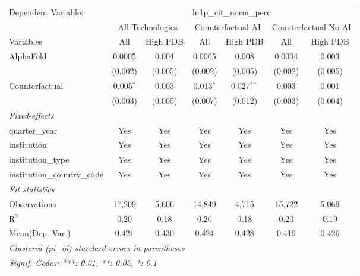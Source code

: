 \begingroup
\centering
\begin{tabular}{lcccccc}
   \tabularnewline \midrule \midrule
   Dependent Variable: & \multicolumn{6}{c}{ln1p\_cit\_norm\_perc}\\
 & \multicolumn{2}{c}{All Technologies} & \multicolumn{2}{c}{Counterfactual AI} & \multicolumn{2}{c}{Counterfactual No AI} \\
\cmidrule(lr){1-1}\cmidrule(lr){2-3} \cmidrule(lr){4-5} \cmidrule(lr){6-7}
Variables & \multicolumn{1}{c}{All} & \multicolumn{1}{c}{High PDB} & \multicolumn{1}{c}{All} & \multicolumn{1}{c}{High PDB} & \multicolumn{1}{c}{All} & \multicolumn{1}{c}{High PDB} \\
\cmidrule(lr){1-1}\cmidrule(lr){2-2} \cmidrule(lr){3-3} \cmidrule(lr){4-4} \cmidrule(lr){5-5} \cmidrule(lr){6-6} \cmidrule(lr){7-7}
   AlphaFold                    & 0.0005      & 0.004   & 0.0005      & 0.008        & 0.0004  & 0.003\\   
                                & (0.002)     & (0.005) & (0.002)     & (0.005)      & (0.002) & (0.005)\\   
   Counterfactual               & 0.005$^{*}$ & 0.003   & 0.013$^{*}$ & 0.027$^{**}$ & 0.003   & 0.001\\   
                                & (0.003)     & (0.005) & (0.007)     & (0.012)      & (0.003) & (0.004)\\   
   \midrule
   \emph{Fixed-effects}\\
   quarter\_year                & Yes         & Yes     & Yes         & Yes          & Yes     & Yes\\  
   institution                  & Yes         & Yes     & Yes         & Yes          & Yes     & Yes\\  
   institution\_type            & Yes         & Yes     & Yes         & Yes          & Yes     & Yes\\  
   institution\_country\_code   & Yes         & Yes     & Yes         & Yes          & Yes     & Yes\\  
   \midrule
   \emph{Fit statistics}\\
   Observations                 & 17,209      & 5,606   & 14,849      & 4,715        & 15,722  & 5,069\\  
   R$^2$                        & 0.20        & 0.18    & 0.20        & 0.18         & 0.20    & 0.19\\  
Mean(Dep. Var.) & 0.421 & 0.430 & 0.424 & 0.428 & 0.419 & 0.426 \\
   \midrule \midrule
   \multicolumn{7}{l}{\emph{Clustered (pi\_id) standard-errors in parentheses}}\\
   \multicolumn{7}{l}{\emph{Signif. Codes: ***: 0.01, **: 0.05, *: 0.1}}\\
\end{tabular}
\par\endgroup
